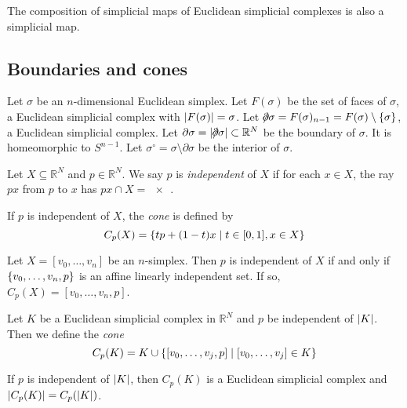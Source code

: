 \begin{remark}
	The composition of simplicial maps of Euclidean simplicial complexes is also a simplicial map.
\end{remark}

\subsection{Boundaries and cones}
\begin{definition}
	Let \( \sigma \) be an \( n \)-dimensional Euclidean simplex.
	Let \( F(\sigma) \) be the set of faces of \( \sigma \), a Euclidean simplicial complex with \( \abs{F(\sigma)} = \sigma \).
	Let \( \bound \sigma = F(\sigma)_{n-1} = F(\sigma) \setminus \qty{\sigma} \), a Euclidean simplicial complex.
	Let \( \partial \sigma = \abs{\bound \sigma} \subset \mathbb R^N \) be the boundary of \( \sigma \).
	It is homeomorphic to \( S^{n-1} \).
	Let \( \sigma^\circ = \sigma \setminus \partial \sigma \) be the interior of \( \sigma \).
\end{definition}
\begin{definition}
	Let \( X \subseteq \mathbb R^N \) and \( p \in \mathbb R^N \).
	We say \( p \) is \emph{independent} of \( X \) if for each \( x \in X \), the ray \( px \) from \( p \) to \( x \) has \( px \cap X = \qty{x} \).
\end{definition}
\begin{definition}
	If \( p \) is independent of \( X \), the \emph{cone} is defined by
	\[ C_p(X) = \qty{tp + (1-t)x \mid t \in [0,1], x \in X} \]
\end{definition}
\begin{example}
	Let \( X = [v_0,\dots,v_n] \) be an \( n \)-simplex.
	Then \( p \) is independent of \( X \) if and only if \( \qty{v_0, \dots, v_n, p} \) is an affine linearly independent set.
	If so, \( C_p(X) = [v_0, \dots, v_n, p] \).
\end{example}
\begin{definition}
	Let \( K \) be a Euclidean simplicial complex in \( \mathbb R^N \) and \( p \) be independent of \( \abs{K} \).
	Then we define the \emph{cone}
	\[ C_p(K) = K \cup \qty{[v_0, \dots, v_j, p] \mid [v_0, \dots, v_j] \in K} \]
\end{definition}
\begin{lemma}
	If \( p \) is independent of \( \abs{K} \), then \( C_p(K) \) is a Euclidean simplicial complex and \( \abs{C_p(K)} = C_p(\abs{K}) \).
\end{lemma}

